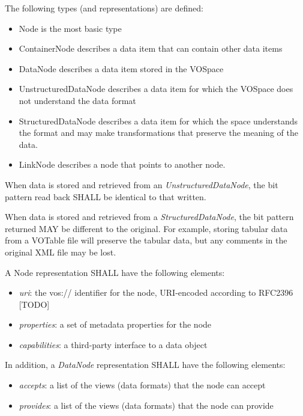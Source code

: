 \documentclass[11pt,a4paper]{ivoa}
\begin{document}
The following types (and representations) are defined:

\begin{itemize}
    \item Node is the most basic type
    \item ContainerNode describes a data item that can contain other data items
    \item DataNode describes a data item stored in the VOSpace
    \item UnstructuredDataNode describes a data item for which the VOSpace does not understand the data format
    \item StructuredDataNode describes a data item for which the space understands the format and may make transformations that preserve the meaning of the data.
    \item LinkNode describes a node that points to another node.
\end{itemize}

When data is stored and retrieved from an \emph{UnstructuredDataNode}, the bit pattern read back SHALL be identical to that written.

When data is stored and retrieved from a \emph{StructuredDataNode}, the bit pattern returned MAY be different to the original. For example, storing tabular data from a VOTable file will preserve the tabular data, but any comments in the original XML file may be lost.

A Node representation SHALL have the following elements:

\begin{itemize}
    \item \emph{uri}: the vos:// identifier for the node, URI-encoded according to RFC2396 [TODO]
    \item \emph{properties}: a set of metadata properties for the node
    \item \emph{capabilities}: a third-party interface to a data object
\end{itemize}

In addition, a \emph{DataNode} representation SHALL have the following elements:

\begin{itemize}
    \item \emph{accepts}: a list of the views (data formats) that the node can accept
    \item \emph{provides}: a list of the views (data formats) that the node can provide
\end{itemize}
\end{document}
